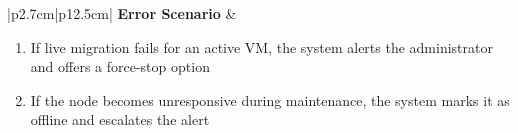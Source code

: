 \begin{table}[H]
\begin{tabular}{|p{2.7cm}|p{12.5cm}|}
        \hline
        \textbf{Error Scenario} & \begin{minipage}[t]{\linewidth}
                                      \begin{enumerate}[topsep=0pt,itemsep=1pt,parsep=0pt,partopsep=0pt]
                                          \item If live migration fails for an active VM, the system alerts the administrator and offers a force-stop option
                                          \item If the node becomes unresponsive during maintenance, the system marks it as offline and escalates the alert
                                      \end{enumerate}
                                  \end{minipage} \\
        \hline
    \end{tabular}
    \label{tab:admin-vm-maintenance-mode}
\end{table}
